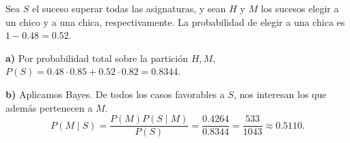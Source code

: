 Sea $S$ el suceso superar todas las asignaturas, y sean $H$ y $M$
los sucesos elegir a un chico y a una chica, respectivamente.
La probabilidad de elegir a una chica es $1-0.48=0.52$.

\textbf{a)} Por probabilidad total sobre la partición $H,M$,
$P(S)=0.48\cdot0.85+0.52\cdot0.82=\boxed{0.8344}$.

\textbf{b)} Aplicamos Bayes. De todos los casos favorables a $S$,
nos interesan los que además pertenecen a $M$.
\[
P(M\mid S)=\frac{P(M)P(S\mid M)}{P(S)}
=\frac{0.4264}{0.8344}=\boxed{\frac{533}{1043}\approx0.5110}.
\]
